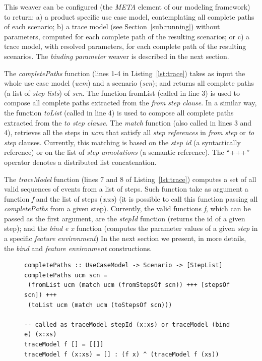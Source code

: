 \documentclass{acm_proc_article-sp}
\begin{document}
This weaver can be configured (the \emph{META} element of
our modeling framework) to return: a) a product specific use case
model, contemplating all complete paths of each scenario; b) a trace
model (see Section~\ref{sub:running}) without parameters, computed
for each complete path of the resulting scenarios; or c) a trace model,
with resolved parameters, for each complete path of the resulting
scenarios. The \emph{binding parameter} weaver is described
in the next section.

The \emph{completePaths} function (lines 1-4 in Listing~\ref{lst:trace}) 
takes as input the whole use case model (\emph{ucm}) and a scenario (\emph{scn});
and returns all complete paths (a list of \emph{step lists}) of
\emph{scn}. The function fromList (called in line 3) is used to
compose all complete paths extracted from the \emph{from step
clause}. In a similar way, the function \emph{toList} (called in
line 4) is used to compose all complete paths extracted from the
\emph{to step clause}. The \emph{match} function (also called in
lines 3 and 4), retrieves all the steps in \emph{ucm} that satisfy all 
\emph{step references} in \emph{from step} or \emph{to step}
clauses. Currently, this matching is based on the \emph{step id} (a
syntactically reference) or on the list of \emph{step annotations}
(a semantic reference). The ``+++'' operator denotes a distributed
list concatenation.


The \emph{traceModel} function (lines 7 and 8 of
Listing~\ref{lst:trace}) computes a set of all valid sequences of 
events from a list of steps. Such function take as argument a function
\emph{f} and the list of steps (\emph{x:xs}) (it is possible to call
this function passing  all \emph{completePaths} from a given step).
Currently, the valid functions \emph{f}, which can be passed as the
first argument, are the \emph{stepId} function (returns the id
of a given step); and the \emph{bind e x} function (computes the
parameter values of a given \emph{step} in a specific \emph{feature
environment}) In the next section we present, in more details, the \emph{bind} and \emph{feature
environment} constructions.

\begin{figure}
\begin{lstlisting}[belowskip=10pt,frame=tb,caption={The \emph{completePaths} and \emph{traceModel weaver} 
functions},label=lst:trace]
completePaths :: UseCaseModel -> Scenario -> [StepList]
completePaths ucm scn =
 (fromList ucm (match ucm (fromStepsOf scn)) +++ [stepsOf scn]) +++ 
 (toList ucm (match ucm (toStepsOf scn)))

-- called as traceModel stepId (x:xs) or traceModel (bind e) (x:xs)
traceModel f [] = [[]]
traceModel f (x:xs) = [] : (f x) ^ (traceModel f (xs))
\end{lstlisting}
\end{figure}
\end{document}
